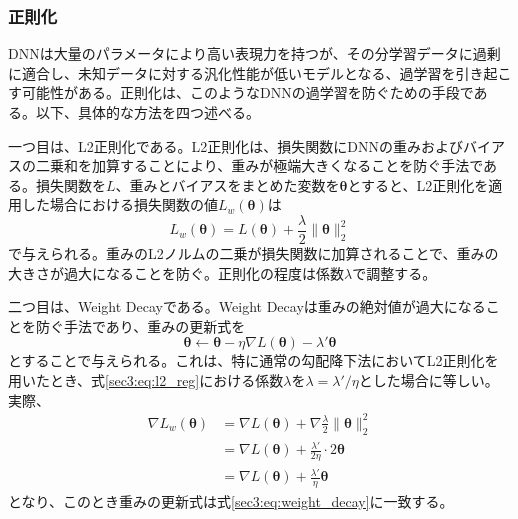 \documentclass[12pt]{jarticle}
\numberwithin{equation}{section}    %
\numberwithin{figure}{section}      %
\numberwithin{table}{section}      %
\begin{document}
\subsubsection{正則化}
DNNは大量のパラメータにより高い表現力を持つが、その分学習データに過剰に適合し、未知データに対する汎化性能が低いモデルとなる、過学習を引き起こす可能性がある。正則化は、このようなDNNの過学習を防ぐための手段である。以下、具体的な方法を四つ述べる。

一つ目は、L2正則化である。L2正則化は、損失関数にDNNの重みおよびバイアスの二乗和を加算することにより、重みが極端大きくなることを防ぐ手法である。損失関数を$L$、重みとバイアスをまとめた変数を$\bm{\theta}$とすると、L2正則化を適用した場合における損失関数の値$L_{w}(\bm{\theta})$は
\begin{equation}
    \label{sec3:eq:l2_reg}
    L_{w}(\bm{\theta}) = L(\bm{\theta}) + \frac{\lambda}{2} \|\bm{\theta}\|_{2}^{2}
\end{equation}
で与えられる。重みのL2ノルムの二乗が損失関数に加算されることで、重みの大きさが過大になることを防ぐ。正則化の程度は係数$\lambda$で調整する。

二つ目は、Weight Decayである。Weight Decayは重みの絶対値が過大になることを防ぐ手法であり、重みの更新式を
\begin{equation}
    \label{sec3:eq:weight_decay}
    \bm{\theta} \leftarrow \bm{\theta} - \eta \nabla L(\bm{\theta}) - \lambda' \bm{\theta}
\end{equation}
とすることで与えられる。これは、特に通常の勾配降下法においてL2正則化を用いたとき、式\eqref{sec3:eq:l2_reg}における係数$\lambda$を$\lambda = \lambda' / \eta$とした場合に等しい\cite{loshchilov2017decoupled}。実際、
\begin{align}
    \nabla L_{w}(\bm{\theta}) & = \nabla L(\bm{\theta}) + \nabla \frac{\lambda}{2} \|\bm{\theta}\|_{2}^{2} \\
                              & = \nabla L(\bm{\theta}) + \frac{\lambda'}{2\eta} \cdot 2\bm{\theta}        \\
                              & = \nabla L(\bm{\theta}) + \frac{\lambda'}{\eta} \bm{\theta}
\end{align}
となり、このとき重みの更新式は式\eqref{sec3:eq:weight_decay}に一致する。
\end{document}
